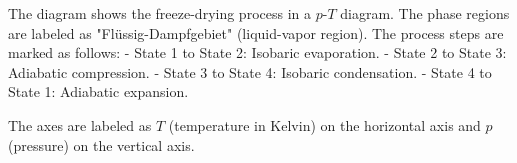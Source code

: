 The diagram shows the freeze-drying process in a \( p \)-\( T \) diagram. The phase regions are labeled as "Flüssig-Dampfgebiet" (liquid-vapor region). The process steps are marked as follows:  
- State 1 to State 2: Isobaric evaporation.  
- State 2 to State 3: Adiabatic compression.  
- State 3 to State 4: Isobaric condensation.  
- State 4 to State 1: Adiabatic expansion.  

The axes are labeled as \( T \) (temperature in Kelvin) on the horizontal axis and \( p \) (pressure) on the vertical axis.